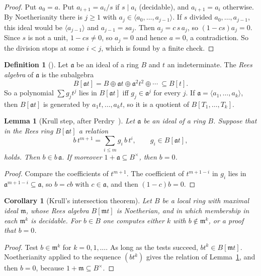 \documentclass[11pt]{article}
\newcommand{\m}{\mathfrak{m}}
\numberwithin{equation}{section}
\theoremstyle{plain}
\newtheorem{lemma}[theorem]{Lemma}
\newtheorem{corollary}[theorem]{Corollary}
\theoremstyle{definition}
\newtheorem{definition}[theorem]{Definition}
\theoremstyle{remark}
\begin{document}
\begin{proof}
Put $a_0=a$. Put $a_{i+1}=a_i/s$ if $s\mid a_i$ (decidable), and $a_{i+1}=a_i$ otherwise. By
Noetherianity there is $j\ge1$ with $a_j\in\langle a_0,\dots,a_{j-1}\rangle$. If $s$ divided
$a_0,\dots,a_{j-1}$, this ideal would be $\langle a_{j-1}\rangle$ and $a_{j-1}=sa_j$. Then
$a_j=c\,s\,a_j$, so $(1-cs)a_j=0$. Since $s$ is not a unit, $1-cs\ne0$, so $a_j=0$ and hence
$a=0$, a contradiction. So the division stops at some $i<j$, which is found by a finite check.
\end{proof}

\begin{definition}[{\cite[XII-2, before Fact~2.5]{LQ}}]\label{d:rees}
Let $\mathfrak{a}$ be an ideal of a ring $B$ and $t$ an indeterminate. The \emph{Rees algebra} of
$\mathfrak{a}$ is the subalgebra
\[
B[\mathfrak{a}t]=B\oplus\mathfrak{a}t\oplus\mathfrak{a}^2t^2\oplus\cdots\ \subseteq B[t].
\]
So a polynomial $\sum g_jt^j$ lies in $B[\mathfrak{a}t]$ iff $g_j\in\mathfrak{a}^j$ for every $j$.
If $\mathfrak{a}=\langle a_1,\dots,a_k\rangle$, then $B[\mathfrak{a}t]$ is generated by $a_1t,\dots,a_kt$,
so it is a quotient of $B[T_1,\dots,T_k]$.
\end{definition}

\begin{lemma}[Krull step, after Perdry~\cite{Pm}]\label{l:krull}
Let $\mathfrak{a}$ be an ideal of a ring $B$. Suppose that in the Rees ring $B[\mathfrak{a}t]$ a
relation
\[
b\,t^{m+1}=\sum_{i\le m}g_i\,b\,t^i,\qquad g_i\in B[\mathfrak{a}t],
\]
holds. Then $b\in b\,\mathfrak{a}$. If moreover $1+\mathfrak{a}\subseteq B^\times$, then $b=0$.
\end{lemma}

\begin{proof}
Compare the coefficients of $t^{m+1}$. The coefficient of $t^{m+1-i}$ in $g_i$ lies in
$\mathfrak{a}^{m+1-i}\subseteq\mathfrak{a}$, so $b=cb$ with $c\in\mathfrak{a}$, and then $(1-c)b=0$.
\end{proof}

\begin{corollary}[Krull's intersection theorem]\label{c:krull}
Let $B$ be a local ring with maximal ideal $\m$, whose Rees algebra $B[\m t]$ is Noetherian, and
in which membership in each $\m^k$ is decidable. For $b\in B$ one computes either $k$ with
$b\notin\m^k$, or a proof that $b=0$.
\end{corollary}

\begin{proof}
Test $b\in\m^k$ for $k=0,1,\dots$. As long as the tests succeed, $bt^k\in B[\m t]$. Noetherianity
applied to the sequence $(bt^k)$ gives the relation of Lemma~\ref{l:krull}, and then $b=0$, because
$1+\m\subseteq B^\times$.
\end{proof}
\end{document}
